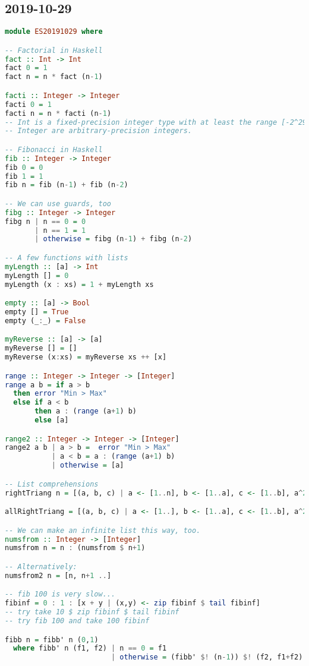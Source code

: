 \subsection{2019-10-29}
\begin{lstlisting}[language=Haskell]
module ES20191029 where

-- Factorial in Haskell
fact :: Int -> Int
fact 0 = 1
fact n = n * fact (n-1)

facti :: Integer -> Integer
facti 0 = 1
facti n = n * facti (n-1)
-- Int is a fixed-precision integer type with at least the range [-2^29 .. 2^29-1].
-- Integer are arbitrary-precision integers.

-- Fibonacci in Haskell
fib :: Integer -> Integer
fib 0 = 0
fib 1 = 1
fib n = fib (n-1) + fib (n-2)

-- We can use guards, too
fibg :: Integer -> Integer
fibg n | n == 0 = 0
       | n == 1 = 1
       | otherwise = fibg (n-1) + fibg (n-2)

-- A few functions with lists
myLength :: [a] -> Int
myLength [] = 0
myLength (x : xs) = 1 + myLength xs

empty :: [a] -> Bool
empty [] = True
empty (_:_) = False

myReverse :: [a] -> [a]
myReverse [] = []
myReverse (x:xs) = myReverse xs ++ [x]

range :: Integer -> Integer -> [Integer]
range a b = if a > b
  then error "Min > Max"
  else if a < b
       then a : (range (a+1) b)
       else [a]

range2 :: Integer -> Integer -> [Integer]
range2 a b | a > b =  error "Min > Max"
           | a < b = a : (range (a+1) b)
           | otherwise = [a]

-- List comprehensions
rightTriang n = [(a, b, c) | a <- [1..n], b <- [1..a], c <- [1..b], a^2 == b^2 + c^2]

allRightTriang = [(a, b, c) | a <- [1..], b <- [1..a], c <- [1..b], a^2 == b^2 + c^2]

-- We can make an infinite list this way, too.
numsfrom :: Integer -> [Integer]
numsfrom n = n : (numsfrom $ n+1)

-- Alternatively:
numsfrom2 n = [n, n+1 ..]

-- fib 100 is very slow...
fibinf = 0 : 1 : [x + y | (x,y) <- zip fibinf $ tail fibinf]
-- try take 10 $ zip fibinf $ tail fibinf
-- try fib 100 and take 100 fibinf

fibb n = fibb' n (0,1)
  where fibb' n (f1, f2) | n == 0 = f1
                         | otherwise = (fibb' $! (n-1)) $! (f2, f1+f2)


\end{lstlisting}
